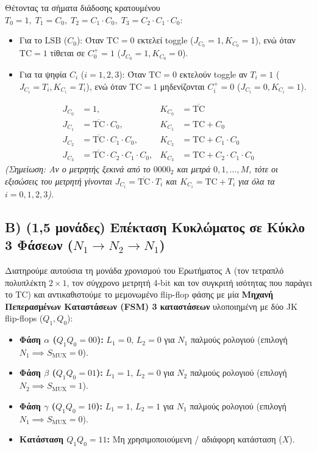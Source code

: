 \documentclass[11pt, a4paper]{article}
\begin{document}
Θέτοντας τα σήματα διάδοσης κρατουμένου $T_0 = 1, \; T_1 = C_0, \; T_2 = C_1 \cdot C_0, \; T_3 = C_2 \cdot C_1 \cdot C_0$:
\begin{itemize}[leftmargin=1.5em, noitemsep]
    \item Για το $\text{LSB}$ ($C_0$): Όταν $\text{TC}=0$ εκτελεί toggle ($J_{C_0}=1, K_{C_0}=1$), ενώ όταν $\text{TC}=1$ τίθεται σε $C_0^+=1$ ($J_{C_0}=1, K_{C_0}=0$).
    \item Για τα ψηφία $C_i$ ($i = 1, 2, 3$): Όταν $\text{TC}=0$ εκτελούν toggle αν $T_i=1$ ($J_{C_i}=T_i, K_{C_i}=T_i$), ενώ όταν $\text{TC}=1$ μηδενίζονται $C_i^+=0$ ($J_{C_i}=0, K_{C_i}=1$).
\end{itemize}
\[
\boxed{\begin{aligned}
J_{C_0} &= 1, & K_{C_0} &= \overline{\text{TC}} \\
J_{C_1} &= \overline{\text{TC}} \cdot C_0, & K_{C_1} &= \text{TC} + C_0 \\
J_{C_2} &= \overline{\text{TC}} \cdot C_1 \cdot C_0, & K_{C_2} &= \text{TC} + C_1 \cdot C_0 \\
J_{C_3} &= \overline{\text{TC}} \cdot C_2 \cdot C_1 \cdot C_0, & K_{C_3} &= \text{TC} + C_2 \cdot C_1 \cdot C_0
\end{aligned}}
\]
\textit{(Σημείωση: Αν ο μετρητής ξεκινά από το $0000_2$ και μετρά $0, 1, \dots, M$, τότε οι εξισώσεις του μετρητή γίνονται $J_{C_i} = \overline{\text{TC}}\cdot T_i$ και $K_{C_i} = \text{TC} + T_i$ για όλα τα $i = 0, 1, 2, 3$).}

\subsection*{Β) (1,5 μονάδες) Επέκταση Κυκλώματος σε Κύκλο 3 Φάσεων ($N_1 \rightarrow N_2 \rightarrow N_1$)}

Διατηρούμε αυτούσια τη μονάδα χρονισμού του Ερωτήματος Α (τον τετραπλό πολυπλέκτη $2\times 1$, τον σύγχρονο μετρητή 4-bit και τον συγκριτή ισότητας που παράγει το $\text{TC}$) και αντικαθιστούμε το μεμονωμένο flip-flop φάσης με μία \textbf{Μηχανή Πεπερασμένων Καταστάσεων (FSM) 3 καταστάσεων} υλοποιημένη με δύο JK flip-flops ($Q_1, Q_0$):
\begin{itemize}[leftmargin=1.5em, noitemsep]
    \item \textbf{Φάση $\alpha$ ($Q_1 Q_0 = 00$):} $L_1 = 0, \, L_2 = 0$ για $N_1$ παλμούς ρολογιού (επιλογή $N_1 \implies S_{\text{MUX}} = 0$).
    \item \textbf{Φάση $\beta$ ($Q_1 Q_0 = 01$):} $L_1 = 1, \, L_2 = 0$ για $N_2$ παλμούς ρολογιού (επιλογή $N_2 \implies S_{\text{MUX}} = 1$).
    \item \textbf{Φάση $\gamma$ ($Q_1 Q_0 = 10$):} $L_1 = 1, \, L_2 = 1$ για $N_1$ παλμούς ρολογιού (επιλογή $N_1 \implies S_{\text{MUX}} = 0$).
    \item \textbf{Κατάσταση $Q_1 Q_0 = 11$:} Μη χρησιμοποιούμενη / αδιάφορη κατάσταση ($X$).
\end{itemize}
\end{document}
